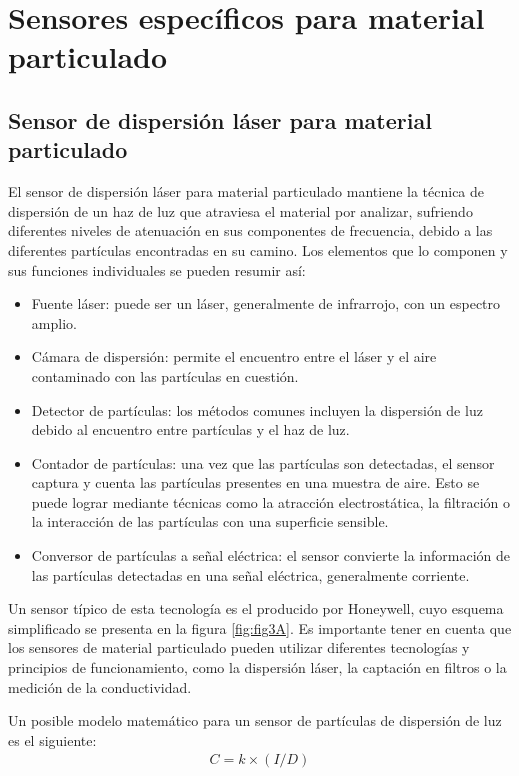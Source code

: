 \section{Sensores específicos para material particulado}

\subsection{Sensor de dispersión láser para material particulado}

El sensor de dispersión láser para material particulado mantiene la técnica de dispersión de un haz de luz que atraviesa el material por analizar, sufriendo diferentes niveles de atenuación en sus componentes de frecuencia, debido a las diferentes partículas encontradas en su camino. Los elementos que lo componen y sus funciones individuales se pueden resumir así:
\begin{itemize}
  \item Fuente láser: puede ser un láser, generalmente de infrarrojo, con un espectro amplio.
  \item Cámara de dispersión: permite el encuentro entre el láser y el aire contaminado con las partículas en cuestión.
  \item Detector de partículas: los métodos comunes incluyen la dispersión de luz debido al encuentro entre partículas y el haz de luz.
  \item Contador de partículas: una vez que las partículas son detectadas, el sensor captura y cuenta las partículas presentes en una muestra de aire. Esto se puede lograr mediante técnicas como la atracción electrostática, la filtración o la interacción de las partículas con una superficie sensible.
  \item Conversor de partículas a señal eléctrica: el sensor convierte la información de las partículas detectadas en una señal eléctrica, generalmente corriente.
\end{itemize}
Un sensor típico de esta tecnología es el producido por Honeywell, cuyo esquema simplificado se presenta en la figura \ref{fig:fig3A}.
Es importante tener en cuenta que los sensores de material particulado pueden utilizar diferentes tecnologías y principios de funcionamiento, como la dispersión láser, la captación en filtros o la medición de la conductividad.

Un posible modelo matemático para un sensor de partículas de dispersión de luz es el siguiente:
\begin{align}
  C = k \times (I / D)
\end{align}

